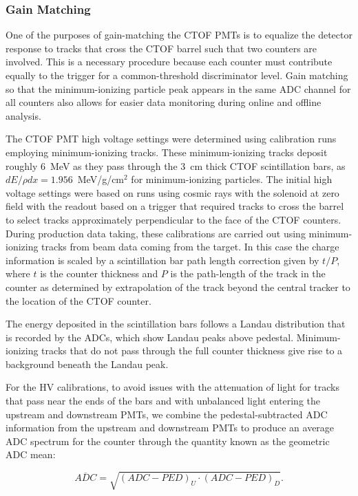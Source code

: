 \documentclass{elsart}
\begin{document}
\subsubsection{Gain Matching}
\label{gain-matching}

One of the purposes of gain-matching the CTOF PMTs is to equalize the detector response to tracks that
cross the CTOF barrel such that two counters are involved. This is a necessary procedure because each
counter must contribute equally to the trigger for a common-threshold discriminator level. Gain matching
so that the minimum-ionizing particle peak appears in the same ADC channel for all counters also allows for
easier data monitoring during online and offline analysis.

The CTOF PMT high voltage settings were determined using calibration runs employing minimum-ionizing
tracks. These minimum-ionizing tracks deposit roughly 6~MeV as they pass through the 3~cm thick CTOF
scintillation bars, as $dE/\rho dx = 1.956$~MeV/g/cm$^2$ for minimum-ionizing particles. The initial high
voltage settings were based on runs using cosmic rays with the solenoid at zero field with the readout
based on a trigger that required tracks to cross the barrel to select tracks approximately perpendicular to
the face of the CTOF counters. During production data taking, these calibrations are carried out using
minimum-ionizing tracks from beam data coming from the target. In this case the charge information is
scaled by a scintillation bar path length correction given by $t/P$, where $t$ is the counter thickness and
$P$ is the path-length of the track in the counter as determined by extrapolation of the track beyond the
central tracker to the location of the CTOF counter.

The energy deposited in the scintillation bars follows a Landau distribution that is recorded by the ADCs,
which show Landau peaks above pedestal. Minimum-ionizing tracks that do not pass through the full counter
thickness give rise to a background beneath the Landau peak.

For the HV calibrations, to avoid issues with the attenuation of light for tracks that pass near the ends of
the bars and with unbalanced light entering the upstream and downstream PMTs, we combine the
pedestal-subtracted ADC information from the upstream and downstream PMTs to produce an average
ADC spectrum for the counter through the quantity known as the geometric ADC mean:

\begin{equation}
\label{adc}
\overline{ADC} = \sqrt{ (ADC - PED)_U \cdot (ADC - PED)_D}.
\end{equation}
\end{document}
